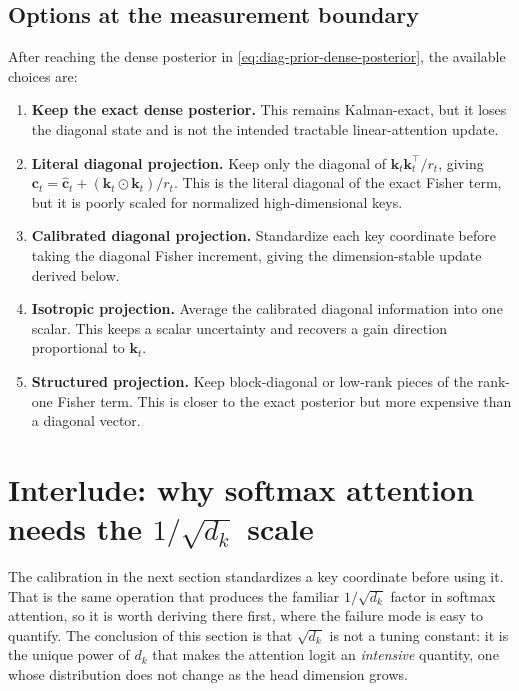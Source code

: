 \documentclass[11pt]{article}
\newcommand{\ve}[1]{\boldsymbol{#1}}
\newcommand{\tr}{\intercal}
\begin{document}
\subsection*{Options at the measurement boundary}

After reaching the dense posterior in \eqref{eq:diag-prior-dense-posterior}, the available
choices are:
\begin{enumerate}[leftmargin=1.6em,itemsep=3pt]
  \item \textbf{Keep the exact dense posterior.} This remains Kalman-exact, but it loses the
  diagonal state and is not the intended tractable linear-attention update.

  \item \textbf{Literal diagonal projection.} Keep only the diagonal of
  $\ve{k}_t\ve{k}_t^{\tr}/r_t$, giving
  $\ve{c}_t=\widehat{\ve{c}}_t+(\ve{k}_t\odot\ve{k}_t)/r_t$. This is the literal diagonal of the
  exact Fisher term, but it is poorly scaled for normalized high-dimensional keys.

  \item \textbf{Calibrated diagonal projection.} Standardize each key coordinate before taking
  the diagonal Fisher increment, giving the dimension-stable update derived below.

  \item \textbf{Isotropic projection.} Average the calibrated diagonal information into one
  scalar. This keeps a scalar uncertainty and recovers a gain direction proportional to
  $\ve{k}_t$.

  \item \textbf{Structured projection.} Keep block-diagonal or low-rank pieces of the
  rank-one Fisher term. This is closer to the exact posterior but more expensive than a
  diagonal vector.
\end{enumerate}

\section{Interlude: why softmax attention needs the $1/\sqrt{d_k}$ scale}
\label{sec:attention-sqrt-dk}

The calibration in the next section standardizes a key coordinate before using it. That is the
same operation that produces the familiar $1/\sqrt{d_k}$ factor in softmax attention, so it is
worth deriving there first, where the failure mode is easy to quantify. The conclusion of this
section is that $\sqrt{d_k}$ is not a tuning constant: it is the unique power of $d_k$ that makes
the attention logit an \emph{intensive} quantity, one whose distribution does not change as the
head dimension grows.
\end{document}
